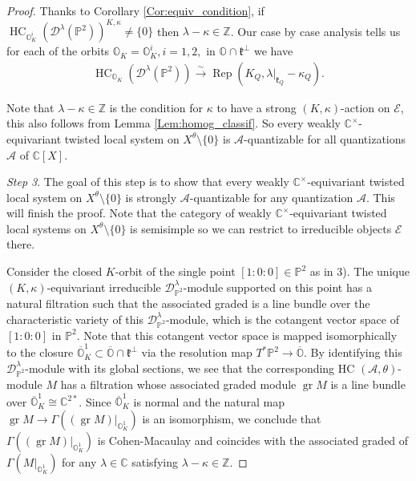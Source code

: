 \documentclass[12pt]{amsart}
\newcommand{\C}{\mathbb{C}}
\newcommand{\A}{\mathcal{A}}
\newcommand{\Orb}{\mathbb{O}}
\newcommand{\Z}{\mathbb{Z}}
\newcommand{\gr}{\operatorname{gr}}
\newcommand{\kf}{\mathfrak{k}}
\newcommand{\HC}{\operatorname{HC}}
\newcommand{\Pb}{\mathbb{P}}
\theoremstyle{definition}
\numberwithin{equation}{section}
\begin{document}
\begin{proof}
Thanks to Corollary \ref{Cor:equiv_condition}, if $\HC_{\Orb^i_K}(\mathscr{D}^\lambda(\Pb^2))^{K,\kappa}\neq \{0\}$
then $\lambda-\kappa\in \Z$.
Our case by case analysis tells us for each of the orbits $\Orb_K=\Orb^i_K,i=1,2,$ in $\Orb\cap \kf^\perp$ we have
\begin{align*}%
\HC_{\Orb_K}(\mathscr{D}^\lambda(\Pb^2))\xrightarrow{\sim}\operatorname{Rep}(K_Q, \lambda|_{\kf_Q}- \kappa_Q).
\end{align*}

Note that $\lambda - \kappa \in \Z$ is the condition for $\kappa$ to have
a strong $(K,\kappa)$-action on $\mathcal{E}$, this also follows from
Lemma \ref{Lem:homog_classif}.
So every weakly $\C^\times$-equivariant twisted local system on $X^\theta\setminus \{0\}$
is $\A$-quantizable for all quantizations $\A$ of $\C[X]$.

{\it Step 3}. The goal of this step is to show that every weakly $\C^\times$-equivariant twisted local
system on $X^\theta\setminus \{0\}$ is strongly $\A$-quantizable for any quantization $\A$. This will finish the proof. Note that the category of weakly $\C^\times$-equivariant twisted local systems on
$X^\theta\setminus \{0\}$ is semisimple so we can restrict to irreducible objects $\mathcal{E}$ there.

Consider the closed $K$-orbit of the single point $[1:0:0] \in \Pb^2$ as in 3). The unique $(K,\kappa)$-equivariant irreducible $\mathscr{D}^\lambda_{\Pb^2}$-module supported on this point has a natural filtration such that the associated graded is a line bundle over the characteristic variety of this $\mathscr{D}^\lambda_{\Pb^2}$-module, which is the cotangent vector space of $[1:0:0]$ in $\Pb^2$. Note that this cotangent vector space is mapped isomorphically to the closure $\overline{\Orb}^1_K \subset \overline{\Orb}\cap \kf^\perp$ via the resolution map $T^*\Pb^2 \to \overline{\Orb}$. By identifying this $\mathscr{D}^\lambda_{\mathbb{P}^2}$-module with its global sections, we see that the corresponding HC $(\A,\theta)$-module $M$ has a filtration whose associated graded module $\gr M$ is a line bundle over $\overline{\Orb}^1_K \cong \C^{2*}$. Since $\overline{\Orb}^1_K$ is normal and the natural map $\gr M \to \Gamma((\gr M)|_{\Orb^1_K})$ is an isomorphism, we conclude that $\Gamma((\gr M)|_{\Orb^1_K})$ is Cohen-Macaulay and coincides
with the associated graded of $\Gamma(M|_{\Orb^1_K})$ for any $\lambda \in \C$ satisfying $\lambda - \kappa \in \Z$.


\end{proof}
\end{document}
